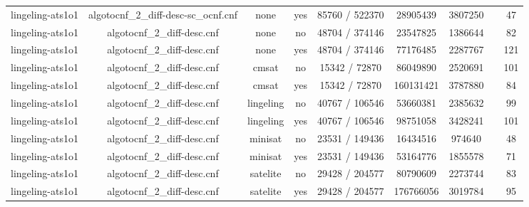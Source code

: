 \begin{appendices}
\begin{table}[p]
\begin{center}
\begin{tabular}{l|cccccccc}
  lingeling-ats1o1               & algotocnf\_2\_diff-desc-sc\_ocnf.cnf & none       & yes   & 85760 / 522370 & 28905439  & 3807250   &            & 47 \\ %
  lingeling-ats1o1               & algotocnf\_2\_diff-desc.cnf    & none       & no    & 48704 / 374146 & 23547825  & 1386644   &            & 82 \\ %
  lingeling-ats1o1               & algotocnf\_2\_diff-desc.cnf    & none       & yes   & 48704 / 374146 & 77176485  & 2287767   &            & 121 \\ %
  lingeling-ats1o1               & algotocnf\_2\_diff-desc.cnf    & cmsat      & no    & 15342 / 72870 & 86049890  & 2520691   &            & 101 \\ %
  lingeling-ats1o1               & algotocnf\_2\_diff-desc.cnf    & cmsat      & yes   & 15342 / 72870 & 160131421 & 3787880   &            & 84 \\ %
  lingeling-ats1o1               & algotocnf\_2\_diff-desc.cnf    & lingeling  & no    & 40767 / 106546 & 53660381  & 2385632   &            & 99 \\ %
  lingeling-ats1o1               & algotocnf\_2\_diff-desc.cnf    & lingeling  & yes   & 40767 / 106546 & 98751058  & 3428241   &            & 101 \\ %
  lingeling-ats1o1               & algotocnf\_2\_diff-desc.cnf    & minisat    & no    & 23531 / 149436 & 16434516  & 974640    &            & 48 \\ %
  lingeling-ats1o1               & algotocnf\_2\_diff-desc.cnf    & minisat    & yes   & 23531 / 149436 & 53164776  & 1855578   &            & 71 \\ %
  lingeling-ats1o1               & algotocnf\_2\_diff-desc.cnf    & satelite   & no    & 29428 / 204577 & 80790609  & 2273744   &            & 83 \\ %
  lingeling-ats1o1               & algotocnf\_2\_diff-desc.cnf    & satelite   & yes   & 29428 / 204577 & 176766056 & 3019784   &            & 95 \\ %

\end{tabular}
\end{center}
\end{table}
\end{appendices}
